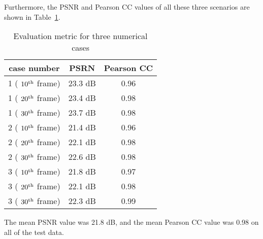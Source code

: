 Furthermore, the PSNR and Pearson CC values of all these three scenarios are 
shown in Table~\ref{tab:psnr_pearson}. 
\begin{table}[ht]
	\centering
	\caption{Evaluation metric for three numerical cases}
	\begin{tabular}{@{}ccc@{}}
		\toprule
		case number       & PSRN    & Pearson CC \\ \midrule
		1 ( $10\textsuperscript{th}$ frame) & 23.3 dB & 0.96       \\ \midrule
		1 ( $20\textsuperscript{th}$ frame)    & 23.4 dB & 0.98       \\ 
		\midrule
		1 ( $30\textsuperscript{th}$ frame)    & 23.7 dB & 0.98       \\ 
		\midrule
		2 ( $10\textsuperscript{th}$ frame) & 21.4 dB & 0.96       \\ \midrule
		2 ( $20\textsuperscript{th}$ frame)    & 22.1 dB & 0.98       \\ 
		\midrule
		2 ( $30\textsuperscript{th}$ frame)    & 22.6 dB & 0.98       \\ 
		\midrule
		3 ( $10\textsuperscript{th}$ frame) & 21.8 dB & 0.97       \\ \midrule
		3 ( $20\textsuperscript{th}$ frame) & 22.1 dB & 0.98       \\ \midrule
		3 ( $30\textsuperscript{th}$ frame)    & 22.3 dB & 0.99       \\ 
		\bottomrule
	\end{tabular}
	\label{tab:psnr_pearson}
\end{table}


The mean PSNR value was 21.8 dB, and the mean Pearson CC value was 0.98 
on all of the test data.
